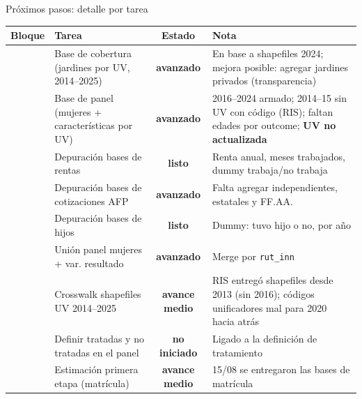 \documentclass[aspectratio=169,10pt]{beamer}
\begin{document}
\begin{frame}{Próximos pasos: detalle por tarea}
\vspace{-8pt}
\tiny
\setlength{\tabcolsep}{2.5pt}
\renewcommand{\arraystretch}{0.85}
\setlength{\aboverulesep}{0.8pt}
\setlength{\belowrulesep}{0.8pt}
\begin{center}
\begin{tabular}{@{}p{1.3cm}p{3.7cm}c p{6.2cm}@{}}
\toprule
\textbf{Bloque} & \textbf{Tarea} & \textbf{Estado} & \textbf{Nota} \\
\midrule
{}
 & Base de cobertura (jardines por UV, 2014--2025) & {\color{schoolgreen}\textbf{avanzado}} & En base a shapefiles 2024; mejora posible: agregar jardines privados (transparencia) \\
 & Base de panel (mujeres + características por UV) & {\color{schoolgreen}\textbf{avanzado}} & 2016--2024 armado; 2014--15 sin UV con código (RIS); faltan edades por outcome; \textcolor{statusred}{\textbf{UV no actualizada}} \\
 & Depuración bases de rentas & {\color{statuslisto}\textbf{listo}} & Renta anual, meses trabajados, dummy trabaja/no trabaja \\
 & Depuración bases de cotizaciones AFP & {\color{schoolgreen}\textbf{avanzado}} & Falta agregar independientes, estatales y FF.AA. \\
 & Depuración bases de hijos & {\color{statuslisto}\textbf{listo}} & Dummy: tuvo hijo o no, por año \\
 & Unión panel mujeres + var. resultado & {\color{schoolgreen}\textbf{avanzado}} & Merge por \texttt{rut\_inn} \\
 & Crosswalk shapefiles UV 2014--2025 & {\color{psuborange}\textbf{avance medio}} & RIS entregó shapefiles desde 2013 (sin 2016); códigos unificadores mal para 2020 hacia atrás \\
 & Definir tratadas y no tratadas en el panel & {\color{statusred}\textbf{no iniciado}} & Ligado a la definición de tratamiento \\
\midrule
{}
 & Estimación primera etapa (matrícula) & {\color{psuborange}\textbf{avance medio}} & 15/08 se entregaron las bases de matrícula \\

\end{tabular}
\end{center}
\end{frame}
\end{document}
